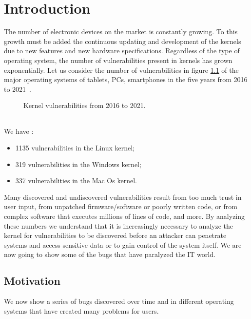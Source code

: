 \documentclass{masterthesis}
\begin{document}
\chapter{Introduction}
\label{ch:intro}
The number of electronic devices on the market is constantly growing.
To this growth must be added the continuous updating and development of the kernels due to new features and new hardware specifications. 
Regardless of the type of operating system, the number of vulnerabilities present in kernels has grown exponentially.
Let us consider the number of vulnerabilities in figure \ref{figure:kernel_vulnerabilities} of the major operating systems of tablets, PCs, smartphones in the five years from 2016 to 2021~\cite{cvedatail}.
\begin{figure}[h!]
   \caption{Kernel vulnerabilities from 2016 to 2021.}
   \label{figure:kernel_vulnerabilities}
\end{figure}
\\
We have : 
\begin{itemize}
\item 1135 vulnerabilities in the Linux kernel;
\item 319 vulnerabilities in the Windows kernel;
\item 337 vulnerabilities in the Mac Os kernel.
\end{itemize}
Many discovered and undiscovered vulnerabilities result from too much trust in user input, from unpatched firmware/software or poorly written code, or from complex software that executes millions of lines of code, and more.
By analyzing these numbers we understand that it is increasingly necessary to analyze the kernel for vulnerabilities to be discovered before an attacker can penetrate systems and access sensitive data or to gain control of the system itself.
We are now going to show some of the bugs that have paralyzed the IT world.

\section{Motivation}
\label{sect:motiv}
We now show a series of bugs discovered over time and in different operating systems that have created many problems for users.
\end{document}
